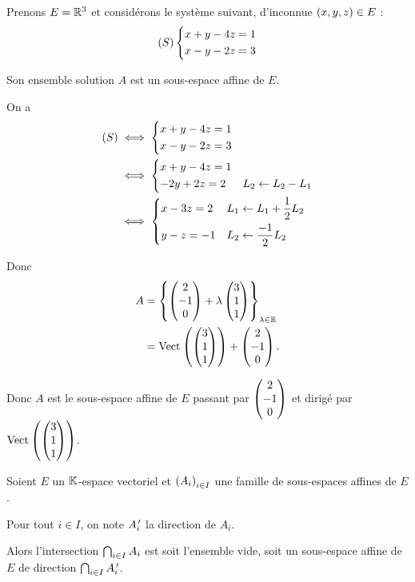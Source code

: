 \begin{ex}
Prenons \(E=\mathbb{R}^3\) et considérons le système suivant, d'inconnue \(\left(x,y,z\right)\in E\) : \[\left(S\right)\begin{dcases}
x+y-4z=1 \\
x-y-2z=3
\end{dcases}\]

Son ensemble solution \(A\) est un sous-espace affine de \(E\).
\end{ex}

\begin{dem}
On a \[\begin{aligned}
\left(S\right)&\iff\begin{dcases}
x+y-4z=1 \\
x-y-2z=3
\end{dcases} \\
&\iff\begin{dcases}
x+y-4z=1 \\
-2y+2z=2 &L_2\gets L_2-L_1
\end{dcases} \\
&\iff\begin{dcases}
x-3z=2 &L_1\gets L_1+\dfrac{1}{2}L_2 \\
y-z=-1 &L_2\gets\dfrac{-1}{2}L_2
\end{dcases}
\end{aligned}\]

Donc \[\begin{aligned}
A&=\accol{\tcoords{2}{-1}{0}+\lambda\tcoords{3}{1}{1}}_{\lambda\in\R} \\
&=\Vect{\tcoords{3}{1}{1}}+\tcoords{2}{-1}{0}.
\end{aligned}\]

Donc \(A\) est le sous-espace affine de \(E\) passant par \(\begin{pmatrix}2\\-1\\0\end{pmatrix}\) et dirigé par \(\Vect{\tcoords{3}{1}{1}}\).
\end{dem}

\begin{prop}
Soient \(E\) un \(\mathbb{K}\)-espace vectoriel et \(\left(A_i\right)_{i\in I}\) une famille de sous-espaces affines de \(E\).

Pour tout \(i\in I\), on note \(A_i^{\,\prime}\) la direction de \(A_i\).

Alors l'intersection \(\bigcap_{i\in I}A_i\) est soit l'ensemble vide, soit un sous-espace affine de \(E\) de direction \(\bigcap_{i\in I}A_i^{\,\prime}\).
\end{prop}

